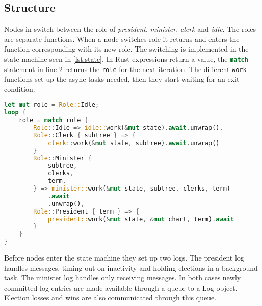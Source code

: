 \subsection{Structure}
Nodes in \name{} switch between the role of \textit{president}, \textit{minister}, \textit{clerk} and \textit{idle}. The roles are separate functions. When a node switches role it returns and enters the function corresponding with its new role. The switching is implemented in the state machine seen in \cref{lst:state}. In Rust expressions return a value, the \lstinline[language=rust]{match} statement in line 2 returns the \lstinline[language=rust]{role} for the next iteration. The different \lstinline[language=rust]{work} functions set up the async tasks needed, then they start waiting for an exit condition.
%
\begin{lstlisting}[float,language=rust,style=boxed,tabsize=2,caption={The state machine switching between a nodes different roles},label=lst:state]
let mut role = Role::Idle;
loop {
	role = match role {
		Role::Idle => idle::work(&mut state).await.unwrap(),
		Role::Clerk { subtree } => {
			clerk::work(&mut state, subtree).await.unwrap()
		}
		Role::Minister {
			subtree,
			clerks,
			term,
		} => minister::work(&mut state, subtree, clerks, term)
			.await
			.unwrap(),
		Role::President { term } => {
			president::work(&mut state, &mut chart, term).await
		}
	}
}
\end{lstlisting}
\clearpage
%
Before nodes enter the state machine they set up two \raft{} logs. The president log handles messages, timing out on inactivity and holding elections in a background task. The minister log handles only receiving messages. In both cases newly committed log entries are made available through a queue to a \raft{} Log object. Election losses and wins are also communicated through this queue.

